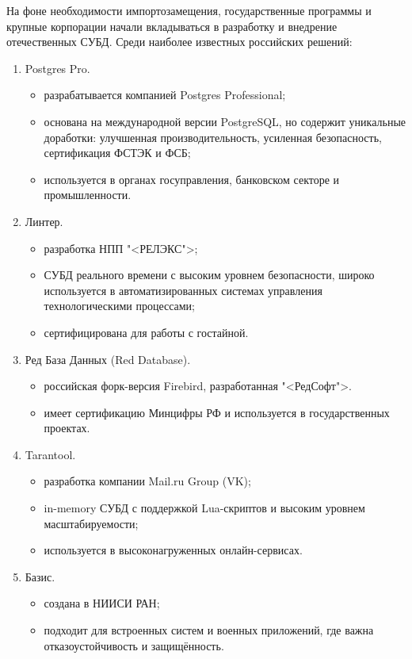 На фоне необходимости импортозамещения, государственные программы и крупные корпорации начали вкладываться в разработку и внедрение отечественных СУБД. Среди наиболее известных российских решений:
\begin{enumerate}
	\item Postgres Pro.
	\begin{itemize}
		\item разрабатывается компанией Postgres Professional;
		\item основана на международной версии PostgreSQL, но содержит уникальные доработки: улучшенная производительность, усиленная безопасность, сертификация ФСТЭК и ФСБ;
		\item используется в органах госуправления, банковском секторе и промышленности.
	\end{itemize}
	\item Линтер.
	\begin{itemize}
		\item разработка НПП "<РЕЛЭКС">;
		\item СУБД реального времени с высоким уровнем безопасности, широко используется в автоматизированных системах управления технологическими процессами;
		\item сертифицирована для работы с гостайной.
	\end{itemize}
	\item Ред База Данных (Red Database).
	\begin{itemize}
		\item российская форк-версия Firebird, разработанная "<РедСофт">.
		\item имеет сертификацию Минцифры РФ и используется в государственных проектах.
	\end{itemize}
	\item Tarantool.
	\begin{itemize}
		\item разработка компании Mail.ru Group (VK);
		\item in-memory СУБД с поддержкой Lua-скриптов и высоким уровнем масштабируемости;
		\item используется в высоконагруженных онлайн-сервисах.
	\end{itemize}
	\item Базис.
	\begin{itemize}
		\item создана в НИИСИ РАН;
		\item подходит для встроенных систем и военных приложений, где важна отказоустойчивость и защищённость.
	\end{itemize}
\end{enumerate}

